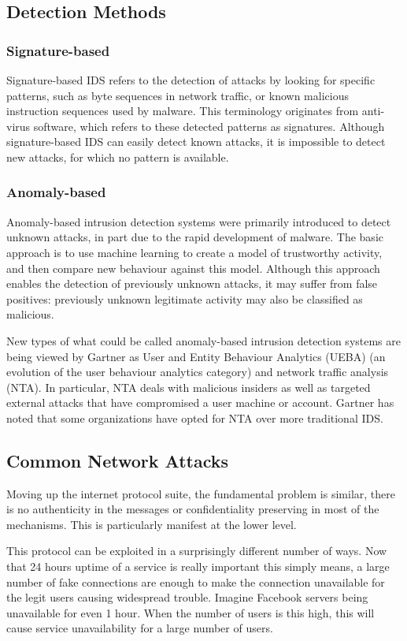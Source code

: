 \documentclass[12pt]{article}
\theoremstyle{definition}
\begin{document}
		\subsection{Detection Methods}
			\subsubsection{Signature-based}
			Signature-based IDS refers to the detection of attacks by looking for specific patterns, such as byte sequences in network traffic, or known malicious instruction sequences used by malware. This terminology originates from anti-virus software, which refers to these detected patterns as signatures. Although signature-based IDS can easily detect known attacks, it is impossible to detect new attacks, for which no pattern is available.
			\subsubsection{Anomaly-based}
			Anomaly-based intrusion detection systems were primarily introduced to detect unknown attacks, in part due to the rapid development of malware. The basic approach is to use machine learning to create a model of trustworthy activity, and then compare new behaviour against this model. Although this approach enables the detection of previously unknown attacks, it may suffer from false positives: previously unknown legitimate activity may also be classified as malicious.
			
			New types of what could be called anomaly-based intrusion detection systems are being viewed by Gartner as User and Entity Behaviour Analytics (UEBA) (an evolution of the user behaviour analytics category) and network traffic analysis (NTA). In particular, NTA deals with malicious insiders as well as targeted external attacks that have compromised a user machine or account. Gartner has noted that some organizations have opted for NTA over more traditional IDS.
		\subsection{Common Network Attacks}
			Moving up the internet protocol suite, the fundamental problem is similar, there is no authenticity in the messages or confidentiality preserving in most of the mechanisms. This is particularly manifest at the lower level. 
			
			This protocol can be exploited in a surprisingly different number of ways. Now that 24 hours uptime of a service is really important this simply means, a large number of fake connections are enough to make the connection unavailable for the legit users causing widespread trouble. Imagine Facebook servers being unavailable for even 1 hour. When the number of users is this high, this will cause service unavailability for a large number of users. 
			
\end{document}
